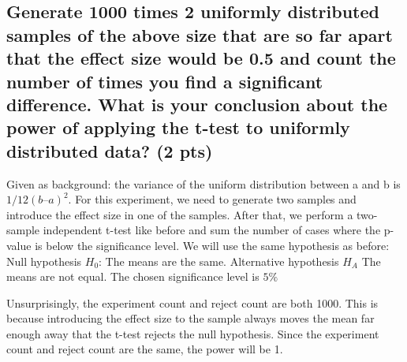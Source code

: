 \documentclass[a4paper]{article}
\begin{document}
\subsection{Generate 1000 times 2 uniformly distributed samples of the above size that are so far apart that the effect size would be 0.5 and count the number of times you find a significant difference. What is your conclusion about the power of applying the t-test to uniformly distributed data? (2 pts)}
Given as background: the variance of the uniform distribution
between a and b is $1/12(b – a)^2$.\newline\newline
For this experiment, we need to generate two samples and introduce the effect size in one of the samples. After that, we perform a two-sample independent t-test like before and sum the number of cases where the p-value is below the significance level. We will use the same hypothesis as before: \newline\newline
Null hypothesis $H_0$: The means are the same.\newline
Alternative hypothesis $H_A$ The means are not equal.\newline
The chosen significance level is $5\%$\newline\newline
{}
Unsurprisingly, the experiment count and reject count are both 1000.
This is because introducing the effect size to the sample always moves the mean far enough away that the t-test rejects the null hypothesis. Since the experiment count and reject count are the same, the power will be 1.
\end{document}
